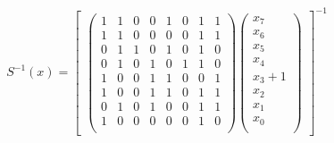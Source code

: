 \begin{align*}
S^{-1}(x) = 
\begin{bmatrix} 
\begin{pmatrix}
1 & 1 & 0 & 0 & 1 & 0 & 1 & 1 \\
1 & 1 & 0 & 0 & 0 & 0 & 1 & 1 \\
0 & 1 & 1 & 0 & 1 & 0 & 1 & 0 \\
0 & 1 & 0 & 1 & 0 & 1 & 1 & 0 \\
1 & 0 & 0 & 1 & 1 & 0 & 0 & 1 \\
1 & 0 & 0 & 1 & 1 & 0 & 1 & 1 \\
0 & 1 & 0 & 1 & 0 & 0 & 1 & 1 \\
1 & 0 & 0 & 0 & 0 & 0 & 1 & 0 \\
\end{pmatrix}
\begin{pmatrix}
x_7 \\
x_6 \\
x_5 \\
x_4 \\
x_3 + 1 \\ 
x_2 \\
x_1 \\
x_0 \\
\end{pmatrix}
\end{bmatrix}^{-1}
\end{align*}

